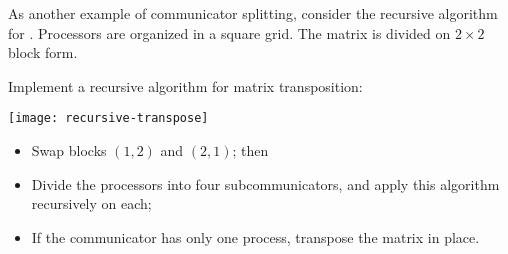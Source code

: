 As another example of communicator splitting, consider the recursive
algorithm for .
%
%
Processors are organized in a square grid. The matrix is divided
on $2\times 2$ block form.

\begin{exercise}
  \label{ex:recursivetranspose}
  Implement a recursive algorithm for matrix transposition:
  
  \texttt{[image: recursive-transpose]}

  \begin{itemize}
  \item Swap blocks $(1,2)$ and $(2,1)$; then
  \item Divide the processors into four subcommunicators, and
    apply this algorithm recursively on each;
  \item If the communicator has only one process, transpose the matrix in place.
  \end{itemize}
\end{exercise}

